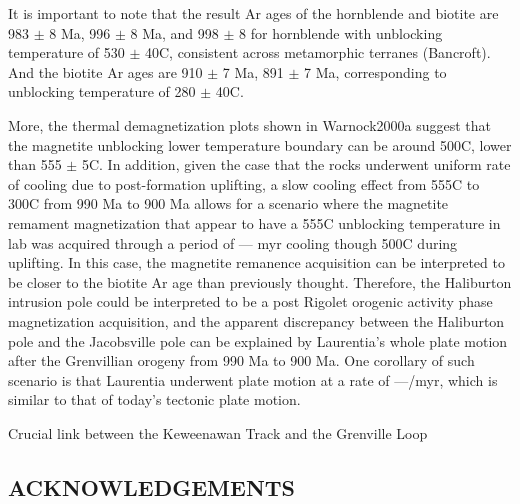 \documentclass[11pt,letterpaper]{article}
\begin{document}
It is important to note that the result Ar ages of the hornblende and biotite are 983 $\pm$ 8 Ma, 996 $\pm$ 8 Ma, and 998 $\pm$ 8 for hornblende with unblocking temperature of 530 $\pm$ 40\textdegree C, consistent across metamorphic terranes (Bancroft). And the biotite Ar ages are 910 $\pm$ 7 Ma, 891 $\pm$ 7 Ma, corresponding to unblocking temperature of 280 $\pm$ 40\textdegree C. 

More, the thermal demagnetization plots shown in Warnock2000a suggest that the magnetite unblocking lower temperature boundary can be around 500\textdegree C, lower than 555 $\pm$ 5\textdegree C. In addition, given the case that the rocks underwent uniform rate of cooling due to post-formation uplifting, a slow cooling effect from 555\textdegree C to 300\textdegree C from 990 Ma to 900 Ma allows for a scenario where the magnetite remament magnetization that appear to have a 555\textdegree C unblocking temperature in lab was acquired through a period of --- myr cooling though 500\textdegree C during uplifting. In this case, the magnetite remanence acquisition can be interpreted to be closer to the biotite Ar age than previously thought. Therefore, the Haliburton intrusion pole could be interpreted to be a post Rigolet orogenic activity phase magnetization acquisition, and the apparent discrepancy between the Haliburton pole and the Jacobsville pole can be explained by Laurentia's whole plate motion after the Grenvillian orogeny from 990 Ma to 900 Ma. One corollary of such scenario is that Laurentia underwent plate motion at a rate of ---\textdegree/myr, which is similar to that of today's tectonic plate motion. 

Crucial link between the Keweenawan Track and the Grenville Loop


\subsection*{ACKNOWLEDGEMENTS}


\singlespacing
\clearpage


\end{document}
